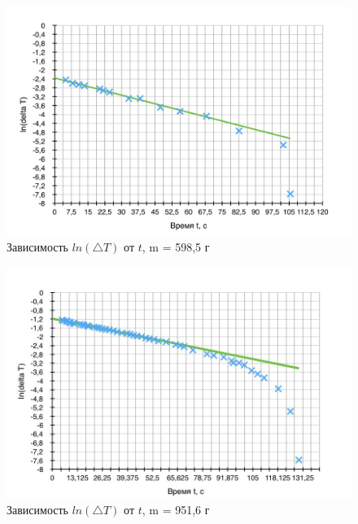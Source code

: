 \documentclass[a4paper]{article}
\begin{document}
\newpage


\begin{figure}[t]
    \centering
    \includegraphics[width=16cm]{598.jpg}
    \caption{Зависимость $ln(\triangle T)$ от $t$, m = 598,5 г}
    \label{fig:vac}
\end{figure}

\newpage

\begin{figure}[b]
    \centering
    \includegraphics[width=16cm]{951.jpg}
    \caption{Зависимость $ln(\triangle T)$ от $t$, m = 951,6 г}
    \label{fig:vac}
\end{figure}

\newpage
\end{document}
